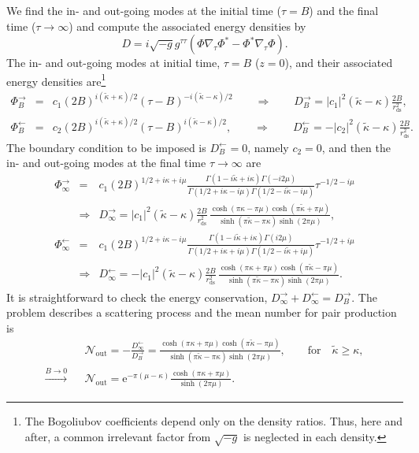 \documentclass[aps,nofootinbib,superscriptaddress
]{revtex4}
\begin{document}
We find the in- and out-going modes at the initial time ($\tau = B$) and the final time ($\tau \to \infty$) and compute the associated energy densities by
\begin{equation}
D = i \sqrt{-g} g^{\tau\tau} (\Phi \nabla_\tau \Phi^* - \Phi^* \nabla_\tau \Phi).
\end{equation}
The in- and out-going modes at initial time, $\tau = B$ ($z = 0$), and their associated energy densities are\footnote{The Bogoliubov coefficients depend only on the density ratios. Thus, here and after, a common irrelevant factor from $\sqrt{-g}$ is neglected in each density.}
\begin{eqnarray} \label{eq_PhiBout}
\Phi_B^\rightarrow &=& c_1 (2 B)^{i (\tilde{\kappa} + \kappa)/2} (\tau - B)^{-i (\tilde{\kappa} - \kappa)/2} \qquad \Rightarrow \qquad D_B^\rightarrow = |c_1|^2 (\tilde{\kappa} - \kappa) \frac{2 B}{r_\mathrm{ds}^2},
\\
\Phi_B^\leftarrow &=& c_2 (2 B)^{i (\tilde{\kappa} + \kappa)/2} (\tau - B)^{i (\tilde{\kappa} - \kappa)/2}, \qquad \Rightarrow \qquad D_B^\leftarrow = - |c_2|^2 (\tilde{\kappa} - \kappa) \frac{2 B}{r_\mathrm{ds}^2}.
\end{eqnarray}
The boundary condition to be imposed is $D_B^\leftarrow = 0$, namely $c_2 = 0$, and then the in- and out-going modes at the final time $\tau \to \infty$ are
\begin{eqnarray}
\Phi_\infty^\rightarrow &=& c_1 (2 B)^{1/2 + i \kappa + i \mu} \frac{\Gamma(1 - i \tilde{\kappa} + i \kappa) \Gamma(-i 2 \mu)}{\Gamma(1/2 + i \kappa - i \mu) \Gamma(1/2 - i \tilde{\kappa} - i \mu)} \tau^{-1/2 - i \mu}
\\
&\Rightarrow& D_\infty^\rightarrow = |c_1|^2 (\tilde{\kappa} - \kappa) \frac{2 B}{r_\mathrm{ds}^2} \, \frac{\cosh(\pi \kappa - \pi \mu) \cosh(\pi \tilde{\kappa} + \pi \mu)}{\sinh(\pi \tilde{\kappa} - \pi \kappa) \sinh(2 \pi \mu)},
\\
\Phi_\infty^\leftarrow &=& c_1 (2 B)^{1/2 + i \kappa - i \mu} \frac{\Gamma(1 - i \tilde{\kappa} + i \kappa) \Gamma(i 2 \mu)}{\Gamma(1/2 + i \kappa + i \mu) \Gamma(1/2 - i \tilde{\kappa} + i \mu)} \tau^{-1/2 + i \mu}
\\
&\Rightarrow& D_\infty^\leftarrow = - |c_1|^2 (\tilde{\kappa} - \kappa) \frac{2 B}{r_\mathrm{ds}^2} \, \frac{\cosh(\pi \kappa + \pi \mu) \cosh(\pi \tilde{\kappa} - \pi \mu)}{\sinh(\pi \tilde{\kappa} - \pi \kappa) \sinh(2 \pi \mu)}.
\end{eqnarray}
It is straightforward to check the energy conservation, $D_\infty^\rightarrow + D_\infty^\leftarrow = D_B^\rightarrow$. The problem describes a scattering process and the mean number for pair production is
\begin{eqnarray} \label{eq_Nout}
&& \mathcal{N}_\mathrm{out} = - \frac{D_\infty^\leftarrow}{D_B^\rightarrow} = \frac{\cosh(\pi \kappa + \pi \mu) \cosh(\pi \tilde{\kappa} - \pi \mu)}{\sinh(\pi \tilde{\kappa} - \pi \kappa) \sinh(2 \pi \mu)}, \qquad \mathrm{for} \quad \tilde{\kappa} \ge \kappa,
\\
\stackrel{B \to 0}{\longrightarrow} && \mathcal{N}_\mathrm{out} = \mathrm{e}^{-\pi (\mu - \kappa)} \frac{\cosh(\pi \kappa + \pi \mu)}{\sinh(2 \pi \mu)}.
\nonumber
\end{eqnarray}
\end{document}
